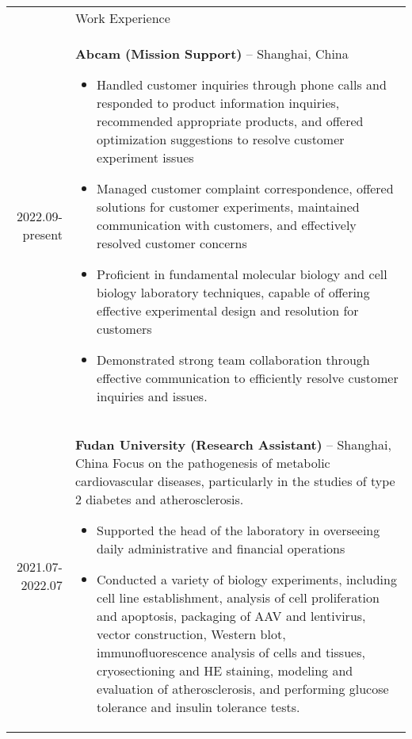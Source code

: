 \documentclass[letterpaper, 11pt]{article}
\newcommand{\headingfont}{\Large\color{LimeGreen}}
\newenvironment{SectionTable}[1]{
	\renewcommand*{\arraystretch}{1.7}
	\setlength{\tabcolsep}{10pt}
	\begin{longtable}{Rp{5.2in}} & #1 \\}
{\end{longtable}\vspace{-.3cm}}
\begin{document}
\begin{SectionTable}{\headingfont Work Experience}

2022.09-present &
\textbf{Abcam (Mission Support)} -- Shanghai, China
\begin{itemize}[itemsep=4pt, label={\textbullet}, parsep=1pt]
	\item Handled customer inquiries through phone calls and responded to product information inquiries, recommended appropriate products, and offered optimization suggestions to resolve customer experiment issues
	\item Managed customer complaint correspondence, offered solutions for customer experiments, maintained communication with customers, and effectively resolved customer concerns
	\item Proficient in fundamental molecular biology and cell biology laboratory techniques, capable of offering effective experimental design and resolution for customers
	\item Demonstrated strong team collaboration through effective communication to efficiently resolve customer inquiries and issues.
\end{itemize} \\

2021.07-2022.07 &
\textbf{Fudan University  (Research Assistant)} -- Shanghai, China \newline
Focus on the pathogenesis of metabolic cardiovascular diseases, particularly in the studies of type 2 diabetes and atherosclerosis. 
\begin{itemize}[itemsep=4pt, label={\textbullet}, parsep=1pt]
	\item Supported the head of the laboratory in overseeing daily administrative and financial operations
	\item Conducted a variety of biology experiments, including cell line establishment, analysis of cell proliferation and apoptosis, packaging of AAV and lentivirus, vector construction, Western blot, immunofluorescence analysis of cells and tissues, cryosectioning and HE staining, modeling and evaluation of atherosclerosis, and performing glucose tolerance and insulin tolerance tests.
\end{itemize}
\end{SectionTable}
\end{document}
